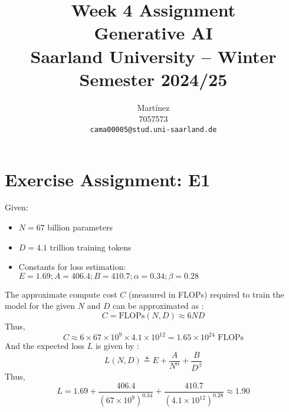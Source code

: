 \documentclass{article}
\title{Week 4 Assignment\\
\vspace{2mm}
\small{Generative AI}
\\
\vspace{2mm}
\small{Saarland University -- Winter Semester 2024/25}
}
\author{%
  Martínez \\
  7057573 \\
  \texttt{cama00005@stud.uni-saarland.de} \\
}
\begin{document}
\DeclareRobustCommand{\textitbf}[1]{\textbf{\textit{#1}}} %

\maketitle

\section{Exercise Assignment: E1}\label{sec:e1}
Given:
\begin{itemize}
    \item $N = 67$ billion parameters
    \item $D = 4.1$ trillion training tokens
    \item Constants for loss estimation: $E = 1.69; A = 406.4; B = 410.7; \alpha = 0.34; \beta = 0.28$
\end{itemize}

The approximate compute cost $C$ (measured in FLOPs) required to train the model for the given $N$ and $D$ can be approximated as \cite{kaplan2020}:
\[
    C = \text{FLOPs}(N, D) \approx 6ND
\]
Thus,
\[
    C \approx 6 \times 67 \times 10^9 \times 4.1 \times 10^{12} = 1.65 \times 10^{24} \text{ FLOPs}
\]
And the expected loss $L$ is given by \cite{hoffmann2022trainingcomputeoptimallargelanguage}:
\[
    L(N,D) \triangleq E + \frac{A}{N^\alpha} + \frac{B}{D^\beta}
\]
Thus,
\[
    L = 1.69 + \frac{406.4}{(67 \times 10^9)^{0.34}} + \frac{410.7}{(4.1 \times 10^{12})^{0.28}} \approx 1.90
\]
\end{document}
